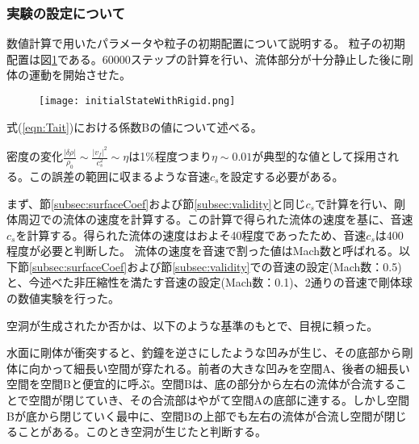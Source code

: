 \documentclass[]{jsarticle}
\begin{document}
\subsubsection{実験の設定について}
数値計算で用いたパラメータや粒子の初期配置について説明する。
粒子の初期配置は図\ref{fig:initialStateWithRigid}である。60000ステップの計算を行い、流体部分が十分静止した後に剛体の運動を開始させた。
\begin{figure}[ht]
  \centering
  \texttt{[image: initialStateWithRigid.png]}
  \caption{\label{fig:initialStateWithRigid} }
\end{figure}



式(\ref{eqn:Tait})における係数Bの値について述べる。

密度の変化$\frac{\left| \delta \rho \right|}{\rho_0}\sim \frac{\left| v_f \right|^2}{c_s^2}\sim\eta$は1\%程度つまり$\eta\sim 0.01$が典型的な値として採用される\cite{Becker2007}。この誤差の範囲に収まるような音速$c_s$を設定する必要がある。

まず、節\ref{subsec:surfaceCoef}および節\ref{subsec:validity}と同じ$c_s$で計算を行い、剛体周辺での流体の速度を計算する。この計算で得られた流体の速度を基に、音速$c_s$を計算する。得られた流体の速度はおよそ40程度であったため、音速$c_s$は400程度が必要と判断した。
流体の速度を音速で割った値はMach数と呼ばれる。以下節\ref{subsec:surfaceCoef}および節\ref{subsec:validity}での音速の設定(Mach数：0.5)と、今述べた非圧縮性を満たす音速の設定(Mach数：0.1)、2通りの音速で剛体球の数値実験を行った。


空洞が生成されたか否かは、以下のような基準のもとで、目視に頼った。

水面に剛体が衝突すると、釣鐘を逆さにしたような凹みが生じ、その底部から剛体に向かって細長い空間が穿たれる。前者の大きな凹みを空間A、後者の細長い空間を空間Bと便宜的に呼ぶ。空間Bは、底の部分から左右の流体が合流することで空間が閉じていき、その合流部はやがて空間Aの底部に達する。しかし空間Bが底から閉じていく最中に、空間Bの上部でも左右の流体が合流し空間が閉じることがある。このとき空洞が生じたと判断する。
\end{document}
